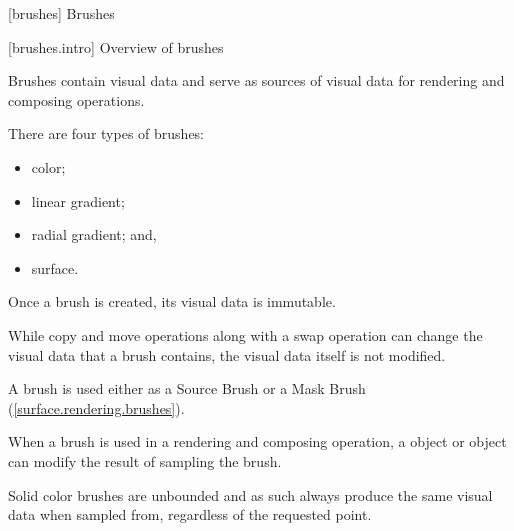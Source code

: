 
 [brushes] {Brushes}

 [brushes.intro] {Overview of brushes}

\pnum
Brushes contain visual data and serve as sources of visual data for rendering and composing operations.

There are four types of brushes:
\begin{itemize}
	\item color;
	\item linear gradient;
	\item radial gradient; and,
	\item surface.
\end{itemize}

\pnum
Once a brush is created, its visual data is immutable.

\pnum
\enternote
While copy and move operations along with a swap operation can change the visual data that a brush contains, the visual data itself is not modified.
\exitnote

\pnum
A brush is used either as a Source Brush or a Mask Brush (\ref{surface.rendering.brushes}).

\pnum
When a brush is used in a rendering and composing operation, a  object or  object can modify the result of sampling the brush.

%
%
%
%
%
%
\pnum
Solid color brushes are unbounded and as such always produce the same visual data when sampled from, regardless of the requested point.

